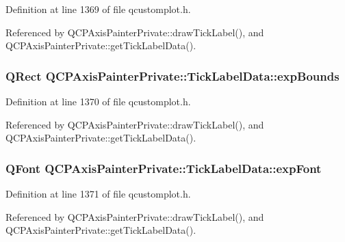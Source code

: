 Definition at line 1369 of file qcustomplot.\+h.



Referenced by Q\+C\+P\+Axis\+Painter\+Private\+::draw\+Tick\+Label(), and Q\+C\+P\+Axis\+Painter\+Private\+::get\+Tick\+Label\+Data().

\hypertarget{struct_q_c_p_axis_painter_private_1_1_tick_label_data_a6722d2bcefb93011e9dc42301b966846}{}
\subsubsection[{exp\+Bounds}]{\setlength{\rightskip}{0pt plus 5cm}Q\+Rect Q\+C\+P\+Axis\+Painter\+Private\+::\+Tick\+Label\+Data\+::exp\+Bounds}\label{struct_q_c_p_axis_painter_private_1_1_tick_label_data_a6722d2bcefb93011e9dc42301b966846}


Definition at line 1370 of file qcustomplot.\+h.



Referenced by Q\+C\+P\+Axis\+Painter\+Private\+::draw\+Tick\+Label(), and Q\+C\+P\+Axis\+Painter\+Private\+::get\+Tick\+Label\+Data().

\hypertarget{struct_q_c_p_axis_painter_private_1_1_tick_label_data_adc10767ebcb719d6927c012a38b9d933}{}
\subsubsection[{exp\+Font}]{\setlength{\rightskip}{0pt plus 5cm}Q\+Font Q\+C\+P\+Axis\+Painter\+Private\+::\+Tick\+Label\+Data\+::exp\+Font}\label{struct_q_c_p_axis_painter_private_1_1_tick_label_data_adc10767ebcb719d6927c012a38b9d933}


Definition at line 1371 of file qcustomplot.\+h.



Referenced by Q\+C\+P\+Axis\+Painter\+Private\+::draw\+Tick\+Label(), and Q\+C\+P\+Axis\+Painter\+Private\+::get\+Tick\+Label\+Data().

\hypertarget{struct_q_c_p_axis_painter_private_1_1_tick_label_data_a09692e4ea092137278b4ac051d5fdf2b}{}
